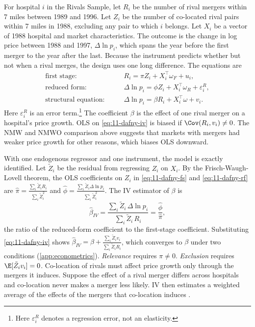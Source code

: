  For hospital $i$ in the Rivals Sample, let $R_i$ be the number of rival mergers
within 7 miles between 1989 and 1996. Let $Z_i$ be the number of co-located rival pairs within 7 miles in 1988,
excluding any pair to which $i$ belongs. Let $X_i$ be a vector of 1988 hospital and market characteristics. The outcome is
the change in log price between 1988 and 1997, $\Delta\ln p_i$, which spans the year before the first merger to the
year after the last. Because the instrument predicts whether but not when a rival merges, the design uses one
long difference. The equations are
\begin{align}
\text{first stage:}\qquad & R_i=\pi Z_i+X_i^{\top}\omega_F+u_i,\label{eq:11-dafny-fs}\\
\text{reduced form:}\qquad & \Delta\ln p_i=\phi Z_i+X_i^{\top}\omega_R+\varepsilon^{R}_i,\label{eq:11-dafny-rf}\\
\text{structural equation:}\qquad & \Delta\ln p_i=\beta R_i+X_i^{\top}\omega+v_i.\label{eq:11-dafny-iv}
\end{align}
Here $\varepsilon^R_i$ is an error term.\footnote{Here $\varepsilon^R_i$ denotes a regression error, not an
elasticity.} The coefficient $\beta$ is the effect of one rival merger on a hospital's price growth. OLS on
\eqref{eq:11-dafny-iv} is biased if $\Cov(R_i,v_i)\neq0$. The NMW and NMWO comparison above suggests that markets
with mergers had weaker price growth for other reasons, which biases OLS downward.

 With one endogenous regressor and one instrument, the model is exactly identified. Let
$\tilde Z_i$ be the residual from regressing $Z_i$ on $X_i$. By the Frisch-Waugh-Lovell theorem, the OLS
coefficients on $Z_i$ in \eqref{eq:11-dafny-fs} and \eqref{eq:11-dafny-rf} are
$\hat\pi=\frac{\sum_i\tilde Z_iR_i}{\sum_i\tilde Z_i^2}$ and
$\hat\phi=\frac{\sum_i\tilde Z_i\Delta\ln p_i}{\sum_i\tilde Z_i^2}$. The IV estimator of $\beta$ is
\begin{equation}\label{eq:11-wald}
\hat\beta_{IV}=\frac{\sum_i\tilde Z_i\,\Delta\ln p_i}{\sum_i\tilde Z_i\,R_i}=\frac{\hat\phi}{\hat\pi},
\end{equation}
the ratio of the reduced-form coefficient to the first-stage coefficient. Substituting \eqref{eq:11-dafny-iv} shows
$\hat\beta_{IV}=\beta+\frac{\sum_i\tilde Z_iv_i}{\sum_i\tilde Z_iR_i}$, which converges to $\beta$ under two
conditions (\cref{app:econometrics}). \emph{Relevance} requires $\pi\neq0$. \emph{Exclusion} requires
$\E[\tilde Z_iv_i]=0$. Co-location of rivals must affect price growth only through the mergers it induces. Suppose the
effect of a rival merger differs across hospitals and co-location never makes a merger less likely. IV then
estimates a weighted average of the effects of the mergers that co-location induces \citep{ImbensAngrist1994}.

